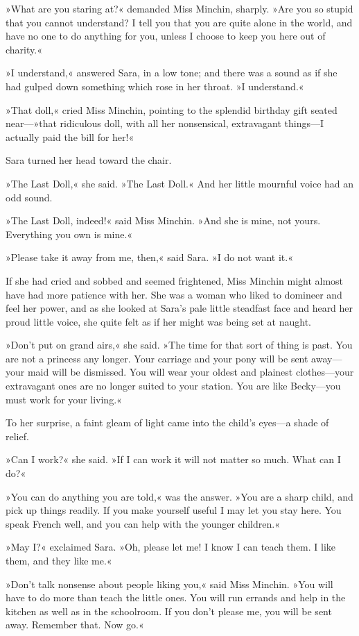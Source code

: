 »What are you staring at?« demanded Miss Minchin, sharply. »Are you so stupid that you cannot understand? I tell you that you are quite alone in the world, and have no one to do anything for you, unless I choose to keep you here out of charity.«

»I understand,« answered Sara, in a low tone; and there was a sound as if she had gulped down something which rose in her throat. »I understand.«

»That doll,« cried Miss Minchin, pointing to the splendid birthday gift seated near—»that ridiculous doll, with all her nonsensical, extravagant things—I actually paid the bill for her!«

Sara turned her head toward the chair.

»The Last Doll,« she said. »The Last Doll.« And her little mournful voice had an odd sound.

»The Last Doll, indeed!« said Miss Minchin. »And she is mine, not yours. Everything you own is mine.«

»Please take it away from me, then,« said Sara. »I do not want it.«

If she had cried and sobbed and seemed frightened, Miss Minchin might almost have had more patience with her. She was a woman who liked to domineer and feel her power, and as she looked at Sara's pale little steadfast face and heard her proud little voice, she quite felt as if her might was being set at naught.

»Don't put on grand airs,« she said. »The time for that sort of thing is past. You are not a princess any longer. Your carriage and your pony will be sent away—your maid will be dismissed. You will wear your oldest and plainest clothes—your extravagant ones are no longer suited to your station. You are like Becky—you must work for your living.«

To her surprise, a faint gleam of light came into the child's eyes—a shade of relief.

»Can I work?« she said. »If I can work it will not matter so much. What can I do?«

»You can do anything you are told,« was the answer. »You are a sharp child, and pick up things readily. If you make yourself useful I may let you stay here. You speak French well, and you can help with the younger children.«

»May I?« exclaimed Sara. »Oh, please let me! I know I can teach them. I like them, and they like me.«

»Don't talk nonsense about people liking you,« said Miss Minchin. »You will have to do more than teach the little ones. You will run errands and help in the kitchen as well as in the schoolroom. If you don't please me, you will be sent away. Remember that. Now go.«

